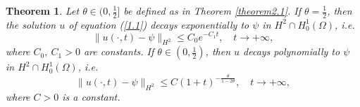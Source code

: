 \documentclass[10pt,a4paper]{amsart}
\newtheorem{theorem}{Theorem}
\begin{document}
\begin{theorem}\label{theorem1.2}
    Let $\theta\in (0,\frac{1}{2}]$ be defined as in Theorem \ref{theorem2.1}. If $\theta=\frac{1}{2}$, then the solution $u$ of equation (\ref{1.1}) decays exponentially to $\psi$ in $H^2\cap H_0^1(\Omega)$, i.e.
    \begin{equation}
        \|u(\cdot,t)-\psi\|_{H^2}\le C_0e^{-C_1t},\quad t\to +\infty,\label{2.33}
    \end{equation}
    where $C_0,\ C_1>0$ are constants.
    If $\theta\in (0,\frac{1}{2})$, then $u$ decays polynomially to $\psi$ in $H^2\cap H_0^1(\Omega)$, i.e.
    \begin{equation}
        \|u(\cdot,t)-\psi\|_{H^2}\le C(1+t)^{-\frac{\theta}{1-2\theta}},\quad t\to +\infty,\label{2.34}
    \end{equation}
    where $C>0$ is a constant.
\end{theorem}
\end{document}
